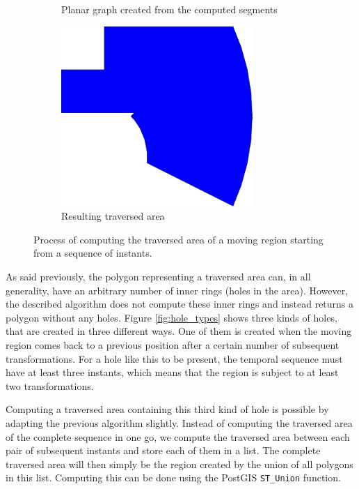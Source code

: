 \begin{figure}[h!]
\begin{subfigure}{.3\textwidth}
        \caption{Planar graph created from the computed segments}
        \label{fig:planar_graph}
    \end{subfigure}
    \hfill
    \begin{subfigure}{.3\textwidth}
        \centering
        \includegraphics[width=0.8\textwidth]{images/process_traversed_area.pdf}
        \caption{Resulting traversed area}{}
    \end{subfigure}
    \caption[Process of computing the traversed area of a moving region]{Process of computing the traversed area of a moving region starting from a sequence of instants.}
    \label{fig:traversed_area_process}
\end{figure}

As said previously, the polygon representing a traversed area can, in all generality, have an arbitrary number of inner rings (holes in the area). However, the described algorithm does not compute these inner rings and instead returns a polygon without any holes. Figure \ref{fig:hole_types} shows three kinds of holes, that are created in three different ways. One of them is created when the moving region comes back to a previous position after a certain number of subsequent transformations. For a hole like this to be present, the temporal sequence must have at least three instants, which means that the region is subject to at least two transformations.

Computing a traversed area containing this third kind of hole is possible by adapting the previous algorithm slightly. Instead of computing the traversed area of the complete sequence in one go, we compute the traversed area between each pair of subsequent instants and store each of them in a list. The complete traversed area will then simply be the region created by the union of all polygons in this list. Computing this can be done using the PostGIS \lstinline{ST_Union} function.